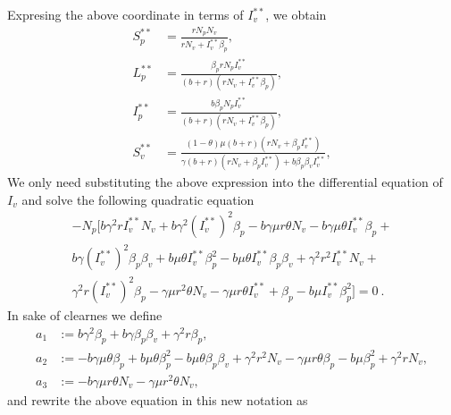 %
Expresing the above coordinate in terms of $I^{**}_v$, we obtain
%
%
\begin{equation*}
	\begin{aligned}
	S^{**}_p &= 
		\frac{
			r N_p N_v
		}{
			r N_v + 
			I^{**}_v 
			\beta_p
		},
	\\
	L^{**}_p &= 
		\frac{
			\beta_p rN_p I^{**}_v
		}{
			\left( 
				b + r 
			\right)
			(
				r N_v + I_v^{**} 
				\beta_p
			)
		},
%
%
	\\
	I^{**}_p &=
		\frac{
			b \beta_p N_p I_v^{**}
		}{
			 \left(
			 	 b + r 
			 \right)
			 ( r N_v + 
			 	I_v^{**} \beta_p
			 )
		},
	\\
	S^{**}_v &=
		\frac{
			 \left( 
			 	1 - \theta 
			 \right)
			 \mu(b + r)
			 (rN_v + \beta_p I_v^{**})
		}{
			\gamma(b + r)
			(r N_v + \beta_p I^{**}_v) + 
			b \beta_p \beta_v I_v^{**}
		},
	\end{aligned}
\end{equation*}
%
%
We only need substituting the above expression into the differential equation 
of $I_v$ and solve the following quadratic equation
%
	\begin{multline}
		-N_p [ 
			b \gamma^2 r I^{**}_v N_v +
			b \gamma^2 (I^{**}_v)^2 \beta_p -
			b \gamma \mu r \theta N_v - 
			b \gamma \mu \theta I^{**}_v \beta_p + 
			\\
			b \gamma (I^{**}_v)^2 \beta_p \beta_v + 
			b \mu \theta I^{**}_v \beta_p ^ 2
			-
			b \mu \theta I^{**}_v \beta_p \beta_v +
			\gamma^2 r^2 I^{**}_v N_v +
			\\
			\gamma^2 r (I ^{**}_v) ^ 2 \beta_p - 
			\gamma\mu r^2 \theta N_v - 
			\gamma\mu r \theta I^{**}_v +
			\beta_p - b\mu I^{**}_v \beta_p^2
		] = 0 \ .
	\end{multline}
% 
In sake of clearnes we define 
\begin{align*}
	a_1 &:= 
		b \gamma^2 \beta_p + 
		b \gamma \beta_p \beta_v + 
		\gamma^2 r \beta_p
		,\\
	a_2 &:=-b \gamma \mu \theta \beta_p + 
		b \mu \theta \beta_p ^ 2 - 
		b \mu \theta \beta_p \beta_v + 
		\gamma^2 r^2 N_v - 
		\gamma \mu r 
		\theta \beta_p - 
		b \mu \beta_p^ 2 + 
		\gamma ^ 2 r N_v,
	\\
	a_3 &:=-b\gamma\mu r\theta N_v-\gamma\mu r^2\theta N_v, 
\end{align*}
%
and rewrite the above equation in this new notation as

